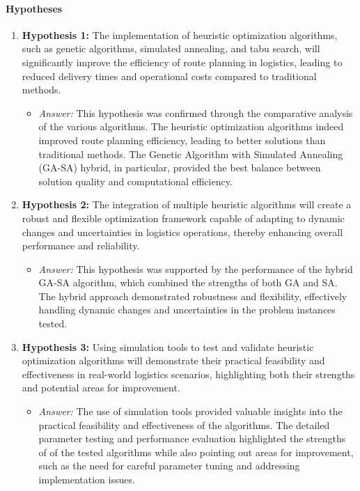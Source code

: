 \documentclass{article}
\begin{document}
    \paragraph{Hypotheses}
    \begin{enumerate}
        \item \textbf{Hypothesis 1:} The implementation of heuristic optimization algorithms, such as genetic algorithms, simulated annealing, and tabu search, will significantly improve the efficiency of route planning in logistics, leading to reduced delivery times and operational costs compared to traditional methods.
        \begin{itemize}
            \item \textit{Answer:} This hypothesis was confirmed through the comparative analysis of the various algorithms. The heuristic optimization algorithms indeed improved route planning efficiency, leading to better solutions than traditional methods. The Genetic Algorithm with Simulated Annealing (GA-SA) hybrid, in particular, provided the best balance between solution quality and computational efficiency.
        \end{itemize}
        \item \textbf{Hypothesis 2:} The integration of multiple heuristic algorithms will create a robust and flexible optimization framework capable of adapting to dynamic changes and uncertainties in logistics operations, thereby enhancing overall performance and reliability.
        \begin{itemize}
            \item \textit{Answer:} This hypothesis was supported by the performance of the hybrid GA-SA algorithm, which combined the strengths of both GA and SA. The hybrid approach demonstrated robustness and flexibility, effectively handling dynamic changes and uncertainties in the problem instances tested.
        \end{itemize}
        \item \textbf{Hypothesis 3:} Using simulation tools to test and validate heuristic optimization algorithms will demonstrate their practical feasibility and effectiveness in real-world logistics scenarios, highlighting both their strengths and potential areas for improvement.
        \begin{itemize}
            \item \textit{Answer:} The use of simulation tools provided valuable insights into the practical feasibility and effectiveness of the algorithms. The detailed parameter testing and performance evaluation highlighted the strengths of of the tested algorithms while also pointing out areas for improvement, such as the need for careful parameter tuning and addressing implementation issues.
        \end{itemize}
    \end{enumerate}
\end{document}
